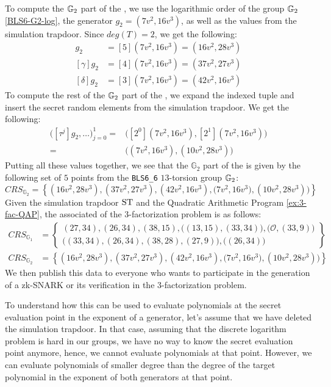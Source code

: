 \begin{example}
To compute the $\mathbb{G}_2$ part of the , we use the logarithmic order of the group $\mathbb{G}_2$ \ref{BLS6-G2-log}, the generator $g_2=(7v^2,16v^3)$, as well as the values from the simulation trapdoor. Since $deg(T)=2$, we get the following:
\begin{align*}
[\beta]g_2 & = [5](7v^2,16v^3) = (16v^2,28v^3) \\
[\gamma]g_2 & = [4](7v^2,16v^3) = (37v^2,27v^3) \\
[\delta]g_2 & = [3](7v^2,16v^3) = (42v^2,16v^3)
\end{align*}
To compute the rest of the $\mathbb{G}_2$ part of the , we expand the indexed tuple and insert the secret random elements from the simulation trapdoor. We get the following:
\begin{align*}
\Big( [\tau^{j}]g_2,\ldots\Big) _{j=0}^{1} = 
 & \Big( [2^0](7v^2,16v^3), [2^1](7v^2,16v^3)\Big)  \\
 = & \Big((7v^2,16v^3),(10v^2,28v^3)\Big)
\end{align*}
Putting all these values together, we see that the $\mathbb{G}_2$ part of the  is given by the following set of $5$ points from the \texttt{BLS6\_6} $13$-torsion group $\mathbb{G}_2$:
$$
CRS_{\mathbb{G}_{2}}=\left\{(16v^2,28v^3) ,(37v^2,27v^3),(42v^2,16v^3),\Big(7v^2,16v^3), (10v^2,28v^3)\Big)\right\} 
$$
Given the simulation trapdoor $\mathrm{ST}$ and the Quadratic Arithmetic Program \ref{ex:3-fac-QAP}, the associated  of the $3$-factorization problem is as follows:
\begin{align*}
CRS_{\mathbb{G}_{1}} &=\left\{ \begin{array}{c}
(27,34),(26,34),(38,15),\Big((13,15),(33,34)\Big),
\Big(\mathcal{O}, (33,9)\Big)\\
\Big((33,34),(26,34),(38,28),(27,9)\Big),
\Big((26,34)\Big)
\end{array}\right\}\\
CRS_{\mathbb{G}_{2}} &=\left\{(16v^2,28v^3) ,(37v^2,27v^3),(42v^2,16v^3),\Big(7v^2,16v^3), (10v^2,28v^3)\Big)\right\}
\end{align*}
We then publish this data to everyone who wants to participate in the generation of a zk-SNARK or its verification in the $3$-factorization problem.

To understand how this  can be used to evaluate polynomials at the secret evaluation point in the exponent of a generator, let's assume that we have deleted the simulation trapdoor. In that case, assuming that the discrete logarithm problem is hard in our groups, we have no way to know the secret evaluation point anymore, hence, we cannot evaluate polynomials at that point. However, we can evaluate polynomials of smaller degree than the degree of the target polynomial in the exponent of both generators at that point. 


\end{example}
